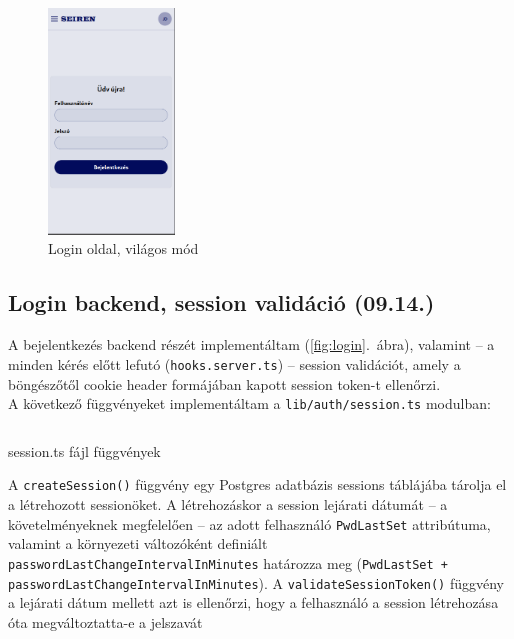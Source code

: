 \documentclass[a4paper]{article}
\newcommand{\inlts}[1]{\texttt{#1}}
\newcommand{\inltxt}[1]{\texttt{#1}}
\begin{document}
\begin{figure}[ht]
  \centering
  \includegraphics[clip, trim=0 10 1 0, width = 0.3\textwidth]{images/login_page.png}
  \caption{Login oldal, világos mód}
  \label{fig:login_page}
\end{figure}

\subsection{Login backend, session validáció (09.14.)}

A bejelentkezés backend részét implementáltam (\ref{fig:login}.~ábra), valamint – a minden
kérés előtt lefutó (\inlts{hooks.server.ts}) – session validációt, amely a böngészőtől cookie
header formájában kapott session token-t ellenőrzi. \\

A következő függvényeket implementáltam a \inltxt{lib/auth/session.ts} modulban:

\begin{listing}[!ht]
\inputminted[bgcolor=codebg, breaklines, breakanywhere, fontsize=\small]{typescript}{code/session.ts}
\caption{session.ts fájl függvények}
\label{listing:8}
\end{listing}

A \inlts{createSession()} függvény egy Postgres adatbázis sessions táblájába tárolja el a
létrehozott sessionöket. A létrehozáskor a session lejárati dátumát – a követelményeknek
megfelelően – az adott felhasználó \inlts{PwdLastSet} attribútuma, valamint a környezeti változóként
definiált \inlts{passwordLastChangeIntervalInMinutes} határozza meg
(\inlts{PwdLastSet + passwordLastChangeIntervalInMinutes}). A \inlts{validateSessionToken()} függvény a lejárati dátum mellett
azt is ellenőrzi, hogy a felhasználó a session létrehozása óta megváltoztatta-e a
jelszavát
\end{document}
